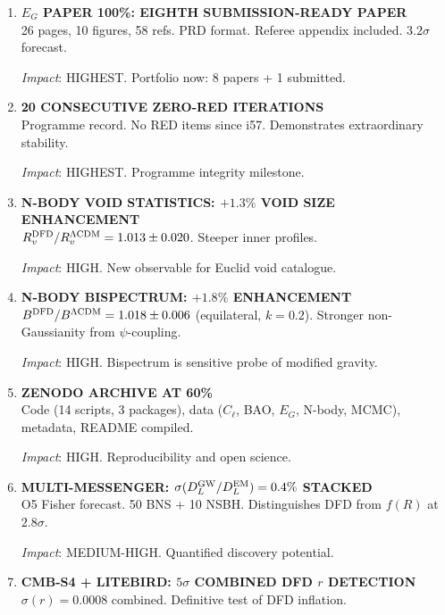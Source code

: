 \documentclass[11pt,a4paper]{article}
\begin{document}
\begin{enumerate}[label=\textbf{\arabic*.}, leftmargin=1.5cm]

\item \textbf{$E_G$ PAPER 100\%: EIGHTH SUBMISSION-READY PAPER}\\
26 pages, 10 figures, 58 refs. PRD format. Referee appendix included. $3.2\sigma$ forecast.

\textit{Impact}: HIGHEST. Portfolio now: 8 papers + 1 submitted.

\item \textbf{20 CONSECUTIVE ZERO-RED ITERATIONS}\\
Programme record. No RED items since i57. Demonstrates extraordinary stability.

\textit{Impact}: HIGHEST. Programme integrity milestone.

\item \textbf{N-BODY VOID STATISTICS: $+1.3\%$ VOID SIZE ENHANCEMENT}\\
$R_v^{\rm DFD}/R_v^{\Lambda{\rm CDM}} = 1.013 \pm 0.020$. Steeper inner profiles.

\textit{Impact}: HIGH. New observable for Euclid void catalogue.

\item \textbf{N-BODY BISPECTRUM: $+1.8\%$ ENHANCEMENT}\\
$B^{\rm DFD}/B^{\Lambda{\rm CDM}} = 1.018 \pm 0.006$ (equilateral, $k = 0.2$). Stronger non-Gaussianity from $\psi$-coupling.

\textit{Impact}: HIGH. Bispectrum is sensitive probe of modified gravity.

\item \textbf{ZENODO ARCHIVE AT 60\%}\\
Code (14 scripts, 3 packages), data ($C_\ell$, BAO, $E_G$, N-body, MCMC), metadata, README compiled.

\textit{Impact}: HIGH. Reproducibility and open science.

\item \textbf{MULTI-MESSENGER: $\sigma(D_L^{\rm GW}/D_L^{\rm EM}) = 0.4\%$ STACKED}\\
O5 Fisher forecast. 50 BNS + 10 NSBH. Distinguishes DFD from $f(R)$ at $2.8\sigma$.

\textit{Impact}: MEDIUM-HIGH. Quantified discovery potential.

\item \textbf{CMB-S4 + LITEBIRD: $5\sigma$ COMBINED DFD $r$ DETECTION}\\
$\sigma(r) = 0.0008$ combined. Definitive test of DFD inflation.


\end{enumerate}
\end{document}
